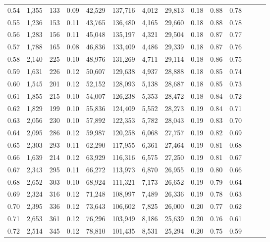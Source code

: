 \begin{tabular}{rrrrrrrrrrrrrr}
0.54 &  1,355 &    133 &  0.09 &   42,529 &  137,716 &   4,012 &  29,813 &  0.18 &  0.88 &      0.78 \\
0.55 &  1,236 &    153 &  0.11 &   43,765 &  136,480 &   4,165 &  29,660 &  0.18 &  0.88 &      0.78 \\
0.56 &  1,283 &    156 &  0.11 &   45,048 &  135,197 &   4,321 &  29,504 &  0.18 &  0.87 &      0.77 \\
0.57 &  1,788 &    165 &  0.08 &   46,836 &  133,409 &   4,486 &  29,339 &  0.18 &  0.87 &      0.76 \\
0.58 &  2,140 &    225 &  0.10 &   48,976 &  131,269 &   4,711 &  29,114 &  0.18 &  0.86 &      0.75 \\
0.59 &  1,631 &    226 &  0.12 &   50,607 &  129,638 &   4,937 &  28,888 &  0.18 &  0.85 &      0.74 \\
0.60 &  1,545 &    201 &  0.12 &   52,152 &  128,093 &   5,138 &  28,687 &  0.18 &  0.85 &      0.73 \\
0.61 &  1,855 &    215 &  0.10 &   54,007 &  126,238 &   5,353 &  28,472 &  0.18 &  0.84 &      0.72 \\
0.62 &  1,829 &    199 &  0.10 &   55,836 &  124,409 &   5,552 &  28,273 &  0.19 &  0.84 &      0.71 \\
0.63 &  2,056 &    230 &  0.10 &   57,892 &  122,353 &   5,782 &  28,043 &  0.19 &  0.83 &      0.70 \\
0.64 &  2,095 &    286 &  0.12 &   59,987 &  120,258 &   6,068 &  27,757 &  0.19 &  0.82 &      0.69 \\
0.65 &  2,303 &    293 &  0.11 &   62,290 &  117,955 &   6,361 &  27,464 &  0.19 &  0.81 &      0.68 \\
0.66 &  1,639 &    214 &  0.12 &   63,929 &  116,316 &   6,575 &  27,250 &  0.19 &  0.81 &      0.67 \\
0.67 &  2,343 &    295 &  0.11 &   66,272 &  113,973 &   6,870 &  26,955 &  0.19 &  0.80 &      0.66 \\
0.68 &  2,652 &    303 &  0.10 &   68,924 &  111,321 &   7,173 &  26,652 &  0.19 &  0.79 &      0.64 \\
0.69 &  2,324 &    316 &  0.12 &   71,248 &  108,997 &   7,489 &  26,336 &  0.19 &  0.78 &      0.63 \\
0.70 &  2,395 &    336 &  0.12 &   73,643 &  106,602 &   7,825 &  26,000 &  0.20 &  0.77 &      0.62 \\
0.71 &  2,653 &    361 &  0.12 &   76,296 &  103,949 &   8,186 &  25,639 &  0.20 &  0.76 &      0.61 \\
0.72 &  2,514 &    345 &  0.12 &   78,810 &  101,435 &   8,531 &  25,294 &  0.20 &  0.75 &      0.59 \\

\end{tabular}
